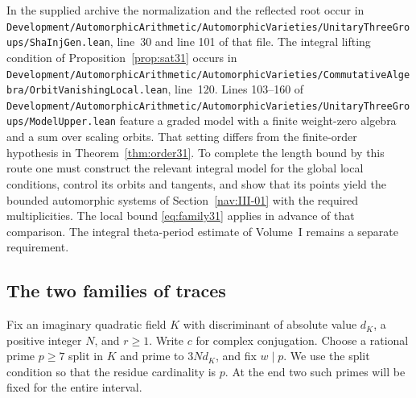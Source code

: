 \documentclass[a4paper,11pt]{article}
\theoremstyle{definition}
\theoremstyle{remark}
\newcommand{\lead}[1]{\par\smallskip\noindent{\bfseries\color{ink}#1.}\enspace}
\newcommand{\srcloc}[2]{{\small\nolinkurl{#1.lean}}, line~#2}
\numberwithin{equation}{section}
\begin{document}
\lead{Connection with the source} In the supplied archive the normalization and the reflected root occur in
\srcloc{Development/AutomorphicArithmetic/AutomorphicVarieties/UnitaryThreeGroups/ShaInjGen}{30} and line 101 of that file. The integral lifting condition of Proposition~\ref{prop:sat31} occurs in \srcloc{Development/AutomorphicArithmetic/AutomorphicVarieties/CommutativeAlgebra/OrbitVanishingLocal}{120}. Lines 103--160 of \nolinkurl{Development/AutomorphicArithmetic/AutomorphicVarieties/UnitaryThreeGroups/ModelUpper.lean} feature a graded model with a finite weight-zero algebra and a sum over scaling orbits. That setting differs from the finite-order hypothesis in Theorem~\ref{thm:order31}. To complete the length bound by this route one must construct the relevant integral model for the global local conditions, control its orbits and tangents, and show that its points yield the bounded automorphic systems of Section~\ref{nav:III-01} with the required multiplicities. The local bound \eqref{eq:family31} applies in advance of that comparison. The integral theta-period estimate of Volume~I remains a separate requirement.

\subsection{The two families of traces}\label{nav:III-00}
Fix an imaginary quadratic field \(K\) with discriminant of absolute value \(d_K\), a positive integer \(N\), and \(r\ge1\). Write \(c\) for complex conjugation. Choose a rational prime \(p\ge7\) split in \(K\) and prime to \(3Nd_K\), and fix \(w\mid p\). We use the split condition so that the residue cardinality is \(p\). At the end two such primes will be fixed for the entire interval.
\end{document}
